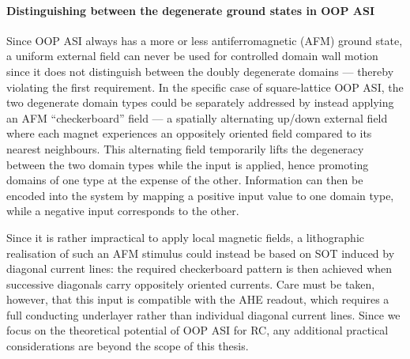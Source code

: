 \paragraph{Distinguishing between the degenerate ground states in OOP ASI}
Since OOP ASI always has a more or less antiferromagnetic (AFM) ground state, a uniform external field can never be used for controlled domain wall motion since it does not distinguish between the doubly degenerate domains --- thereby violating the first requirement.
In the specific case of square-lattice OOP ASI, the two degenerate domain types could be separately addressed by instead applying an AFM ``checkerboard'' field --- a spatially alternating up/down external field where each magnet experiences an oppositely oriented field compared to its nearest neighbours.
This alternating field temporarily lifts the degeneracy between the two domain types while the input is applied, hence promoting domains of one type at the expense of the other.
Information can then be encoded into the system by mapping a positive input value to one domain type, while a negative input corresponds to the other. \par
Since it is rather impractical to apply local magnetic fields, a lithographic realisation of such an AFM stimulus could instead be based on SOT induced by diagonal current lines: the required checkerboard pattern is then achieved when successive diagonals carry oppositely oriented currents.
Care must be taken, however, that this input is compatible with the AHE readout, which requires a full conducting underlayer rather than individual diagonal current lines.
Since we focus on the theoretical potential of OOP ASI for RC, any additional practical considerations are beyond the scope of this thesis. \\\par

